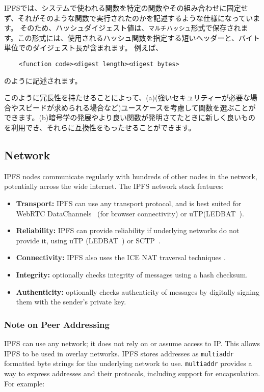 \documentclass{sig-alternate}
\begin{document}
IPFSでは、システムで使われる関数を特定の関数やその組み合わせに固定せず、それがそのような関数で実行されたのかを記述するような仕様になっています。 そのため、ハッシュダイジェスト値は、\texttt {マルチハッシュ}形式で保存されます。この形式には、使用されるハッシュ関数を指定する短いヘッダーと、バイト単位でのダイジェスト長が含まれます。 例えば、
\begin{verbatim}
    <function code><digest length><digest bytes>
\end{verbatim}
のように記述されます。

このように冗長性を持たせることによって、(a)(強いセキュリティーが必要な場合やスピードが求められる場合など)ユースケースを考慮して関数を選ぶことができます。(b)暗号学の発展やより良い関数が発明さてたときに新しく良いものを利用でき、それらに互換性をもったせることができます。

\subsection{Network}

IPFS nodes communicate regularly with hundreds of other nodes in the network, potentially across the wide internet. The IPFS network stack features:

\begin{itemize}
  \item \textbf{Transport:} IPFS can use any transport protocol, and is best suited for WebRTC DataChannels~\cite{WebRTC} (for browser connectivity) or uTP(LEDBAT~\cite{LEDBAT}).
  \item \textbf{Reliability:} IPFS can provide reliability if underlying networks do not provide it, using uTP (LEDBAT~\cite{LEDBAT}) or SCTP~\cite{SCTP}.
  \item \textbf{Connectivity:} IPFS also uses the ICE NAT traversal techniques \cite{ICE}.
  \item \textbf{Integrity:} optionally checks integrity of messages using a hash checksum.
  \item \textbf{Authenticity:} optionally checks authenticity of messages by digitally signing them with the sender's private key.
\end{itemize}

\subsubsection{Note on Peer Addressing}

IPFS can use any network; it does not rely on or assume access to IP. This allows IPFS to be used in overlay networks. IPFS stores addresses as \texttt{multiaddr} formatted byte strings for the underlying network to use. \texttt{multiaddr} provides a way to express addresses and their protocols, including support for encapsulation. For example:
\end{document}
